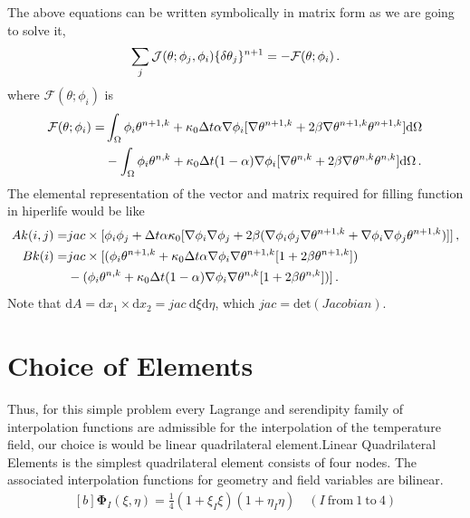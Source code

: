 \documentclass[]{article}
\begin{document}
The above equations can be written symbolically in matrix form as we are going to solve it, 
\begin{equation}\label{eq12}
	\begin{aligned}
		\sum_j \mathcal{J}(\theta;\phi_j,\phi_i)\{\delta \theta_j\}^{n+1} = -\mathcal{F}(\theta;\phi_i)\thinspace.
	\end{aligned}
\end{equation}
where $\mathcal{F}(\theta;\phi_i)$ is
\begin{equation}\label{eq12}
	\begin{aligned}
		\mathcal{F}(\theta;\phi_i)=& \int_{\Omega} \phi_i \theta^{n+1,k} + \kappa_0 \Delta t \alpha \nabla \phi_i [\nabla \theta^{n+1,k}+2\beta \nabla \theta^{n+1,k}\theta^{n+1,k}]\mathrm{d} \Omega \\
		&-\int_{\Omega} \phi_i \theta^{n,k} + \kappa_0 \Delta t (1-\alpha) \nabla \phi_i [\nabla \theta^{n,k}+2\beta \nabla \theta^{n,k}\theta^{n,k}]\mathrm{d} \Omega\thinspace.
	\end{aligned}
\end{equation}
The elemental representation of the vector and matrix required for filling function in hiperlife would be like
\begin{equation}\label{eq13}
	\begin{aligned}[b]
		Ak (i,j) =& jac \times [\phi_i \phi_j + \Delta t \alpha \kappa_0[\nabla \phi_i\nabla \phi_j + 2 \beta(\nabla \phi_i\phi_j  \nabla \theta^{n+1,k} + \nabla \phi_i\nabla \phi_j\theta^{n+1,k} ) ]]\thinspace, \\
		Bk (i) =& jac \times [(\phi_i \theta^{n+1,k} + \kappa_0 \Delta t \alpha \nabla \phi_i \nabla \theta^{n+1,k} [1+2\beta\theta^{n+1,k}]) \\
		&- (\phi_i \theta^{n,k} + \kappa_0 \Delta t (1-\alpha) \nabla \phi_i\nabla \theta^{n,k} [1+2\beta \theta^{n,k}])]\thinspace.
	\end{aligned}
\end{equation}
Note that $\mathrm{d}A=\mathrm{d}x_{1} \times \mathrm{d}x_{2}=jac \ \mathrm{d}\xi \mathrm{d}\eta$, which $jac=\mathrm{det}(Jacobian)$.
\section{Choice of Elements} \label{sec: coe}
Thus, for this simple problem every Lagrange and serendipity family of interpolation functions are admissible for the interpolation of the temperature field, our choice is would be linear quadrilateral element.Linear  Quadrilateral Elements is the simplest quadrilateral element consists of four nodes. The associated interpolation functions for geometry and ﬁeld variables are bilinear.
\begin{equation}\label{eq18}
	\begin{aligned}[b]
		\boldsymbol{\Phi}_{I}(\xi, \eta) = \frac{1}{4}(1+\xi_I\xi)(1+\eta_I\eta) \quad (I \ \text{from} \ 1 \ \text{to} \ 4)
	\end{aligned}
\end{equation}
\end{document}
